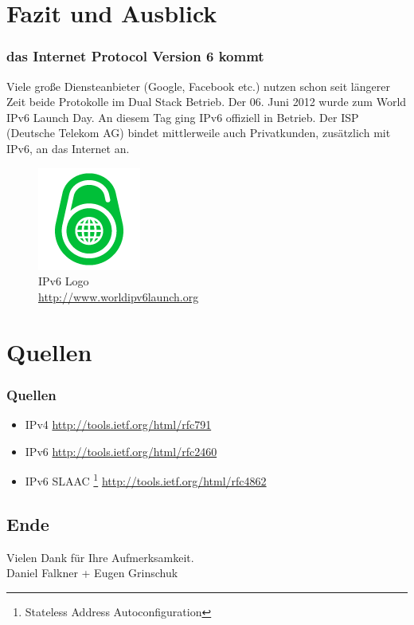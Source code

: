 \documentclass[xcolor=dvipsnames]{beamer}
\newcommand*{\Author}{Daniel Falkner + Eugen Grinschuk} %
\begin{document}
\section{Fazit und Ausblick}
\begin{frame}
 \frametitle{das Internet Protocol Version 6 kommt}
	Viele große Diensteanbieter (Google, Facebook etc.) nutzen schon seit längerer Zeit beide Protokolle im Dual Stack Betrieb. Der 06. Juni 2012 wurde zum World IPv6 Launch Day. An diesem Tag ging IPv6 offiziell in Betrieb. Der ISP (Deutsche Telekom AG) bindet mittlerweile auch Privatkunden, zusätzlich mit IPv6, an das Internet an.
	\begin{figure}
	\includegraphics[scale=0.4]{World_IPv6_launch_logo_128.png}
			\caption{IPv6 Logo \\ \tiny{\textcolor{gray}{\url{http://www.worldipv6launch.org}}}}
	\end{figure} 
\end{frame}

\section{Quellen}
\begin{frame}
 \frametitle{Quellen}
  \begin{block}{}
	  \begin{itemize}
  		\item IPv4 \url{http://tools.ietf.org/html/rfc791}
  		\item IPv6 \url{http://tools.ietf.org/html/rfc2460}
  		\item IPv6 SLAAC \footnote{Stateless Address Autoconfiguration} \url{http://tools.ietf.org/html/rfc4862}
	  \end{itemize}
  \end{block}
\end{frame}

\subsection*{Ende}
\begin{frame}
	\begin{block}{}	
		\begin{center}
			Vielen Dank für Ihre Aufmerksamkeit. \\
			\Author{}
		\end{center}	
	\end{block}
\end{frame}
\end{document}
